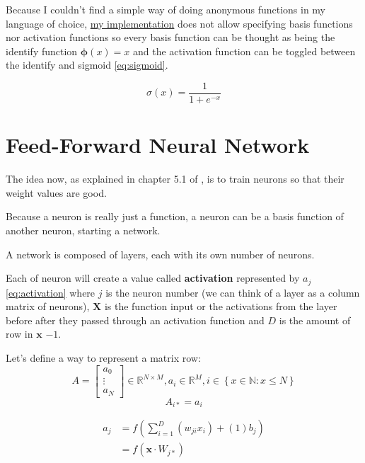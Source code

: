 \documentclass[a4paper,12pt]{article}
\theoremstyle{mytheoremstyle}
\theoremstyle{mytheoremstyle}
\theoremstyle{myproblemstyle}
\begin{document}
    Because I couldn't find a simple way of doing anonymous functions in my
    language of choice, \href{run:../src/utils/neural.zig}{my implementation}
    does not allow specifying basis functions nor activation functions so every
    basis function can be thought as being the identify function $
    \mathbf{\phi}(x) = x $ and the activation function can be toggled between
    the identify and sigmoid \eqref{eq:sigmoid}.

    \begin{equation}
        \sigma\left(x\right) = \frac{1}{1+e^{-x}}
        \label{eq:sigmoid}
    \end{equation}

    \section{Feed-Forward Neural Network}

    The idea now, as explained in chapter 5.1 of \cite{bishop}, is to train
    neurons so that their weight values are good.

    Because a neuron is really just a function, a neuron can be a basis
    function of another neuron, starting a network.


    A network is composed of layers, each with its own number of neurons.


    Each of neuron will create a value called \textbf{activation} represented
    by $ a_{j} $ \eqref{eq:activation} where $ j $ is the neuron number (we can
    think of a layer as a column matrix of neurons), $ \mathbf{X} $ is the
    function input or the activations from the layer before after they passed
    through an activation function and $ D $ is the amount of row in $
    \mathbf{x} $ $ - 1 $.

    Let's define a way to represent a matrix row:
    $$
        A = \begin{bmatrix}a_{0}\\\vdots\\a_{N}\end{bmatrix} \in \mathbb{R}^{N
            \times M}, a_{i} \in \mathbb{R}^{M}, i \in \left\{ x \in
            \mathbb{N}: x \le N \right\}
    $$
    $$
        A_{i *} = a_{i}
    $$

    \begin{equation}
        \begin{split}
            a_{j} & = f \left( \displaystyle\sum_{i=1}^{D} \left( w_{ji}x_{i}
            \right) + (1)b_{j} \right) \\ & = f \left( \mathbf{x} \cdot W_{j *}
            \right)
        \end{split}
        \label{eq:activation}
    \end{equation}
\end{document}

